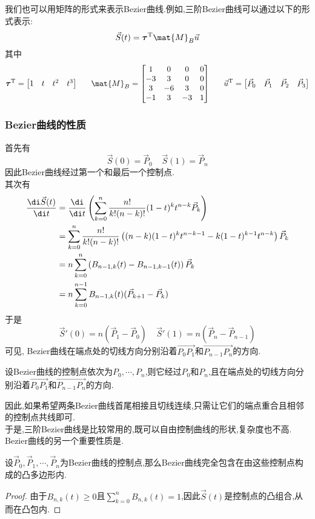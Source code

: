 \documentclass{ctexart}
\begin{document}
\indent 我们也可以用矩阵的形式来表示Bezier曲线.例如,三阶Bezier曲线可以通过以下的形式表示:
\[\vec{S}(t)=\boldsymbol{\tau}^{\text{T}}\mat{M}_{B}\vec{u}\]
其中
\[\boldsymbol{\tau}^{\text{T}}=\begin{bmatrix}1&t&t^2&t^3\end{bmatrix}\ \ \ \ \ \mat{M}_B=\begin{bmatrix}
    1&0&0&0\\
    -3&3&0&0\\
    3&-6&3&0\\
    -1&3&-3&1
\end{bmatrix}\ \ \ \ \ \vec{u}^{\text{T}}=\begin{bmatrix}\vec{P}_0&\vec{P}_1&\vec{P}_2&\vec{P}_3\end{bmatrix}\]
\subsubsection{Bezier曲线的性质}
首先有
\[\vec{S}(0)=\vec{P}_0\ \ \ \ \ \vec{S}(1)=\vec{P}_n\]
因此Bezier曲线经过第一个和最后一个控制点.\\
\indent 其次有
\[\begin{aligned}
    \dfrac{\di\vec{S}(t)}{\di t}
    &= \dfrac{\di}{\di t}\left(\sum_{k=0}^{n}\dfrac{n!}{k!(n-k)!}(1-t)^kt^{n-k}\vec{P}_k\right) \\
    &= \sum_{k=0}^{n}\dfrac{n!}{k!(n-k)!}\left((n-k)(1-t)^kt^{n-k-1}-k(1-t)^{k-1}t^{n-k}\right)\vec{P}_k \\
    &= n\sum_{k=0}^{n}\left(B_{n-1,k}(t)-B_{n-1,k-1}(t)\right)\vec{P}_k\\
    &= n\sum_{k=0}^{n-1}B_{n-1,k}(t)(\vec{P}_{k+1}-\vec{P}_k
)
\end{aligned}\]
于是
\[\vec{S}'(0)=n\left(\vec{P}_1-\vec{P}_0\right)\ \ \ \ \ \vec{S}'(1)=n\left(\vec{P}_n-\vec{P}_{n-1}\right)\]
可见, Bezier曲线在端点处的切线方向分别沿着$\overrightarrow{P_0P_1}$和$\overrightarrow{P_{n-1}P_n}$的方向.
\begin{theorem}[Bezier曲线与端点的关系]
    设Bezier曲线的控制点依次为$P_0,\cdots,P_n$,则它经过$P_0$和$P_n$,且在端点处的切线方向分别沿着$\overrightarrow{P_0P_1}$和$\overrightarrow{P_{n-1}P_n}$的方向.
\end{theorem}
因此,如果希望两条Bezier曲线首尾相接且切线连续,只需让它们的端点重合且相邻的控制点共线即可.\\
\indent 于是,三阶Bezier曲线是比较常用的,既可以自由控制曲线的形状,复杂度也不高.\\
\indent Bezier曲线的另一个重要性质是.
\begin{definition}[凸包性质]
    设$\vec{P}_0,\vec{P}_1,\cdots,\vec{P}_n$为Bezier曲线的控制点,那么Bezier曲线完全包含在由这些控制点构成的凸多边形内.
\end{definition}
\begin{proof}
    由于$B_{n,k}(t)\geqslant 0$且$\displaystyle\sum_{k=0}^nB_{n,k}(t)=1$,因此$\vec{S}(t)$是控制点的凸组合,从而在凸包内.
\end{proof}
\end{document}
